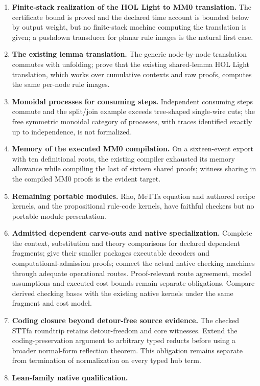\documentclass[11pt,a4paper]{article}
\theoremstyle{plain}
\theoremstyle{definition}
\theoremstyle{remark}
\begin{document}
\begin{enumerate}
\item \textbf{Finite-stack realization of the HOL Light to MM0 translation.} The
  certificate bound is proved and the declared time account is bounded below by
  output weight, but no finite-stack machine computing the translation is
  given; a pushdown transducer for planar rule images is the natural first case.
\item \textbf{The existing lemma translation.} The generic node-by-node
  translation commutes with unfolding; prove that the existing shared-lemma HOL
  Light translation, which works over cumulative contexts and raw proofs,
  computes the same per-node rule images.
\item \textbf{Monoidal processes for consuming steps.} Independent consuming steps
  commute and the split/join example exceeds tree-shaped single-wire cuts; the free
  symmetric monoidal category of processes, with traces identified exactly up to
  independence, is not formalized.
\item \textbf{Memory of the executed MM0 compilation.} On a sixteen-event export
  with ten definitional roots, the existing compiler exhausted its memory allowance
  while compiling the last of sixteen shared proofs; witness sharing in the
  compiled MM0 proofs is the evident target.
\item \textbf{Remaining portable modules.} Rho, MeTTa equation and authored
  recipe kernels, and the propositional rule-code kernels, have faithful checkers
  but no portable module presentation.
\item \textbf{Admitted dependent carve-outs and native specialization.}
  Complete the context, substitution and theory comparisons for declared
  dependent fragments; give their smaller packages executable decoders and
  computational-admission proofs; connect the actual native checking machines
  through adequate operational routes. Proof-relevant route agreement, model
  assumptions and executed cost bounds remain separate obligations. Compare
  derived checking bases with the existing native kernels under the same
  fragment and cost model.
\item \textbf{Coding closure beyond detour-free source evidence.}
  The checked STTfa roundtrip retains detour-freedom and core witnesses.
  Extend the coding-preservation argument to arbitrary typed reducts before
  using a broader normal-form reflection theorem. This obligation remains
  separate from termination of normalization on every typed hub term.
\item \textbf{Lean-family native qualification.}

\end{enumerate}
\end{document}
